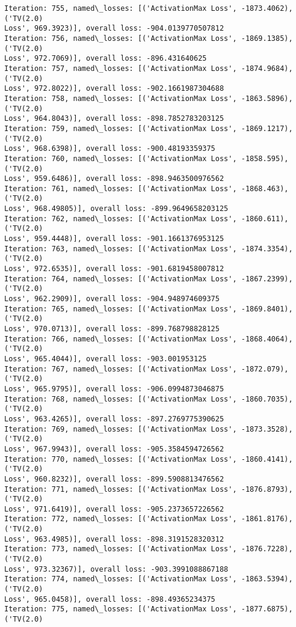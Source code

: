 \documentclass[10pt]{article}
\begin{document}
\begin{Verbatim}[commandchars=\\\{\}]
Iteration: 755, named\_losses: [('ActivationMax Loss', -1873.4062), ('TV(2.0)
Loss', 969.3923)], overall loss: -904.0139770507812
Iteration: 756, named\_losses: [('ActivationMax Loss', -1869.1385), ('TV(2.0)
Loss', 972.7069)], overall loss: -896.431640625
Iteration: 757, named\_losses: [('ActivationMax Loss', -1874.9684), ('TV(2.0)
Loss', 972.8022)], overall loss: -902.1661987304688
Iteration: 758, named\_losses: [('ActivationMax Loss', -1863.5896), ('TV(2.0)
Loss', 964.8043)], overall loss: -898.7852783203125
Iteration: 759, named\_losses: [('ActivationMax Loss', -1869.1217), ('TV(2.0)
Loss', 968.6398)], overall loss: -900.48193359375
Iteration: 760, named\_losses: [('ActivationMax Loss', -1858.595), ('TV(2.0)
Loss', 959.6486)], overall loss: -898.9463500976562
Iteration: 761, named\_losses: [('ActivationMax Loss', -1868.463), ('TV(2.0)
Loss', 968.49805)], overall loss: -899.9649658203125
Iteration: 762, named\_losses: [('ActivationMax Loss', -1860.611), ('TV(2.0)
Loss', 959.4448)], overall loss: -901.1661376953125
Iteration: 763, named\_losses: [('ActivationMax Loss', -1874.3354), ('TV(2.0)
Loss', 972.6535)], overall loss: -901.6819458007812
Iteration: 764, named\_losses: [('ActivationMax Loss', -1867.2399), ('TV(2.0)
Loss', 962.2909)], overall loss: -904.948974609375
Iteration: 765, named\_losses: [('ActivationMax Loss', -1869.8401), ('TV(2.0)
Loss', 970.0713)], overall loss: -899.768798828125
Iteration: 766, named\_losses: [('ActivationMax Loss', -1868.4064), ('TV(2.0)
Loss', 965.4044)], overall loss: -903.001953125
Iteration: 767, named\_losses: [('ActivationMax Loss', -1872.079), ('TV(2.0)
Loss', 965.9795)], overall loss: -906.0994873046875
Iteration: 768, named\_losses: [('ActivationMax Loss', -1860.7035), ('TV(2.0)
Loss', 963.4265)], overall loss: -897.2769775390625
Iteration: 769, named\_losses: [('ActivationMax Loss', -1873.3528), ('TV(2.0)
Loss', 967.9943)], overall loss: -905.3584594726562
Iteration: 770, named\_losses: [('ActivationMax Loss', -1860.4141), ('TV(2.0)
Loss', 960.8232)], overall loss: -899.5908813476562
Iteration: 771, named\_losses: [('ActivationMax Loss', -1876.8793), ('TV(2.0)
Loss', 971.6419)], overall loss: -905.2373657226562
Iteration: 772, named\_losses: [('ActivationMax Loss', -1861.8176), ('TV(2.0)
Loss', 963.4985)], overall loss: -898.3191528320312
Iteration: 773, named\_losses: [('ActivationMax Loss', -1876.7228), ('TV(2.0)
Loss', 973.32367)], overall loss: -903.3991088867188
Iteration: 774, named\_losses: [('ActivationMax Loss', -1863.5394), ('TV(2.0)
Loss', 965.0458)], overall loss: -898.49365234375
Iteration: 775, named\_losses: [('ActivationMax Loss', -1877.6875), ('TV(2.0)

\end{Verbatim}
\end{document}
